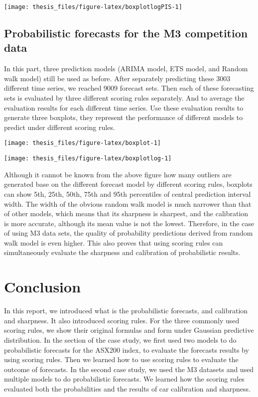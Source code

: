 \documentclass{monashthesis}
\theoremstyle{definition}
\theoremstyle{definition}
\theoremstyle{definition}
\theoremstyle{remark}
\begin{document}
\texttt{[image: thesis\_files/figure-latex/boxplotlogPIS-1]}

\section{Probabilistic forecasts for the M3 competition
data}\label{probabilistic-forecasts-for-the-m3-competition-data}

In this part, three prediction models (ARIMA model, ETS model, and
Random walk model) still be used as before. After separately predicting
these 3003 different time series, we reached 9009 forecast sets. Then
each of these forecasting sets is evaluated by three different scoring
rules separately. And to average the evaluation results for each
different time series. Use these evaluation results to generate three
boxplots, they represent the performance of different models to predict
under different scoring rules.

\texttt{[image: thesis\_files/figure-latex/boxplot-1]}

\texttt{[image: thesis\_files/figure-latex/boxplotlog-1]}

Although it cannot be known from the above figure how many outliers are
generated base on the different forecast model by different scoring
rules, boxplots can show 5th, 25th, 50th, 75th and 95th percentiles of
central prediction interval width. The width of the obvious random walk
model is much narrower than that of other models, which means that its
sharpness is sharpest, and the calibration is more accurate, although
its mean value is not the lowest. Therefore, in the case of using M3
data sets, the quality of probability predictions derived from random
walk model is even higher. This also proves that using scoring rules can
simultaneously evaluate the sharpness and calibration of probabilistic
results.

\chapter{Conclusion}\label{conclusion}

In this report, we introduced what is the probabilistic forecasts, and
calibration and sharpness. It also introduced scoring rules. For the
three commonly used scoring rules, we show their original formulas and
form under Gaussian predictive distribution. In the section of the case
study, we first used two models to do probabilistic forecasts for the
ASX200 index, to evaluate the forecasts results by using scoring rules.
Then we learned how to use scoring rules to evaluate the outcome of
forecasts. In the second case study, we used the M3 datasets and used
multiple models to do probabilistic forecasts. We learned how the
scoring rules evaluated both the probabilities and the results of car
calibration and sharpness.

\printbibliography[heading=bibintoc]
\end{document}
